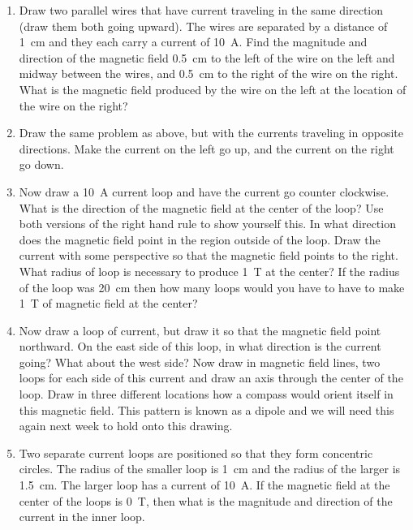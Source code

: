 \begin{enumerate}
\item
Draw two parallel wires that have current traveling in the same direction (draw them both going upward). The wires are separated by a distance of \SI{1}{cm} and they each carry a current of \SI{10}{\ampere}. Find the magnitude and direction of the magnetic field \SI{0.5}{cm} to the left of the wire on the left and midway between the wires, and \SI{0.5}{cm} to the right of the wire on the right. What is the magnetic field produced by the wire on the left at the location of the wire on the right?

\item
Draw the same problem as above, but with the currents traveling in opposite directions. Make the current on the left go up, and the current on the right go down.

\item
Now draw a \SI{10}{\ampere} current loop and have the current go counter clockwise. What is the direction of the magnetic field at the center of the loop? Use both versions of the right hand rule to show yourself this. In what direction does the magnetic field point in the region outside of the loop. Draw the current with some perspective so that the magnetic field points to the right. What radius of loop is necessary to produce \SI{1}{\tesla} at the center? If the radius of the loop was \SI{20}{cm} then how many loops would you have to have to make \SI{1}{\tesla} of magnetic field at the center?

\item
Now draw a loop of current, but draw it so that the magnetic field point northward. On the east side of this loop, in what direction is the current going? What about the west side? Now draw in magnetic field lines, two loops for each side of this current and draw an axis through the center of the loop. Draw in three different locations how a compass would orient itself in this magnetic field. This pattern is known as a dipole and we will need this again next week to hold onto this drawing.

\item
Two separate current loops are positioned so that they form concentric circles. The radius of the smaller loop is \SI{1}{cm} and the radius of the larger is \SI{1.5}{cm}. The larger loop has a current of \SI{10}{\ampere}. If the magnetic field at the center of the loops is \SI{0}{\tesla}, then what is the magnitude and direction of the current in the inner loop.







\newpage 

\ %

\newpage

\end{enumerate}